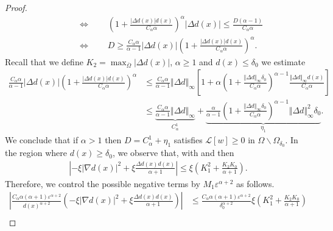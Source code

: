 \documentclass[10pt]{article}
\theoremstyle{plain}
\theoremstyle{remark}
\begin{document}
\begin{proof}
\begin{align*}
    &\qquad\Longleftrightarrow\qquad \left(1+\frac{|\Delta d(x)|d(x)}{C_\alpha\alpha}\right)^\alpha|\Delta d(x)|\leq \frac{D(\alpha-1)}{C_\alpha\alpha}\\
    &\qquad\Longleftrightarrow\qquad D \geq \frac{C_\alpha \alpha}{\alpha-1}|\Delta d(x)|\left(1+\frac{|\Delta d(x)|d(x)}{C_\alpha\alpha}\right)^\alpha.
\end{align*}
Recall that we define $K_2 = \max_{\overline{\Omega}}|\Delta d(x)|$, $\alpha\geq 1$ and $d(x)\leq \delta_0$ we estimate%
\begin{equation*}
\begin{split}
    \frac{C_\alpha \alpha}{\alpha-1}|\Delta d(x)|\left(1+\frac{|\Delta d(x)|d(x)}{C_\alpha\alpha}\right)^\alpha &\leq \frac{C_\alpha\alpha}{\alpha-1}\Vert \Delta d\Vert_{\infty}\left[1+\alpha\left(1+\frac{\Vert \Delta d\Vert_{\infty}\delta_0}{C_\alpha \alpha}\right)^{\alpha-1}\frac{\Vert \Delta d\Vert_\infty d(x)}{C_\alpha\alpha}\right]\\
    &\leq \underbrace{\frac{C_\alpha\alpha}{\alpha-1}\Vert \Delta d\Vert_{\infty}}_{C^1_{\alpha}} +  \underbrace{\frac{\alpha}{\alpha-1}\left(1+\frac{\Vert \Delta d\Vert_{\infty}\delta_0}{C_\alpha \alpha}\right)^{\alpha-1}\Vert \Delta d\Vert_\infty^2\delta_0}_{\eta_1}.
\end{split}
\end{equation*}
We conclude that if $\alpha>1$ then $D = C^1_\alpha + \eta_1$ satisfies $\mathcal{L}[w] \geq 0$ in $\Omega\backslash \Omega_{\delta_0}$. In the region where $d(x)\geq \delta_0$, we observe that, with  and  then
\begin{equation*}
    \begin{split}
        \left|-\xi |\nabla d(x)|^2 + \xi\frac{\Delta d(x)d(x)}{\alpha+1}\right| \leq \xi\left(K_1^2+\frac{K_2K_0}{\alpha+1}\right).
    \end{split}
\end{equation*}
Therefore, we control the possible negative terms by $M_1\varepsilon^{\alpha+2}$ as follows.
\begin{equation*}
\begin{split}
    \left|\frac{C_\alpha\alpha(\alpha+1)\varepsilon^{\alpha+2}}{d(x)^{\alpha+2}}\left(-\xi|\nabla d(x)|^{2} + \xi \frac{\Delta d(x)d(x)}{\alpha+1}\right)\right| &\leq \frac{C_\alpha\alpha(\alpha+1)\varepsilon^{\alpha+2}}{\delta_0^{\alpha+2}}\xi\left(K_1^2+\frac{K_2K_0}{\alpha+1}\right)\\

\end{split}
\end{equation*}
\end{proof}
\end{document}
